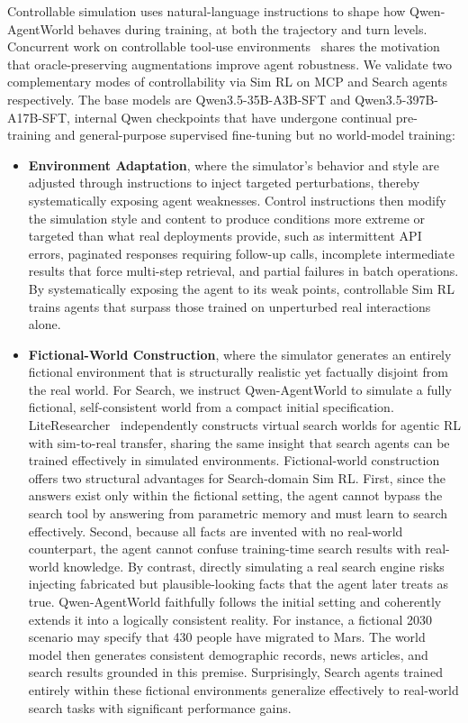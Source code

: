 \documentclass{llmxive}
\providecommand{\method}{Qwen-AgentWorld\xspace}
\begin{document}
Controllable simulation uses natural-language instructions to shape how \method behaves during training, at both the trajectory and turn levels.
Concurrent work on controllable tool-use environments~\citep{xu2026controllable} shares the motivation that oracle-preserving augmentations improve agent robustness.
We validate two complementary modes of controllability via Sim RL on MCP and Search agents respectively.
The base models are Qwen3.5-35B-A3B-SFT and Qwen3.5-397B-A17B-SFT, internal Qwen checkpoints that have undergone continual pre-training and general-purpose supervised fine-tuning but no world-model training:
\begin{itemize}[leftmargin=1.5em,itemsep=2pt]
    \item \textbf{Environment Adaptation}, where the simulator’s behavior and style are adjusted through instructions to inject targeted perturbations, thereby systematically exposing agent weaknesses.
    Control instructions then modify the simulation style and content to produce conditions more extreme or targeted than what real deployments provide, such as intermittent API errors, paginated responses requiring follow-up calls, incomplete intermediate results that force multi-step retrieval, and partial failures in batch operations.
    By systematically exposing the agent to its weak points, controllable Sim RL trains agents that surpass those trained on unperturbed real interactions alone.

    \item \textbf{Fictional-World Construction}, where the simulator generates an entirely fictional environment that is structurally realistic yet factually disjoint from the real world.
    For Search, we instruct \method to simulate a fully fictional, self-consistent world from a compact initial specification.
    LiteResearcher~\citep{li2026literesearcher} independently constructs virtual search worlds for agentic RL with sim-to-real transfer, sharing the same insight that search agents can be trained effectively in simulated environments.
    Fictional-world construction offers two structural advantages for Search-domain Sim RL.
    First, since the answers exist only within the fictional setting, the agent cannot bypass the search tool by answering from parametric memory and must learn to search effectively.
    Second, because all facts are invented with no real-world counterpart, the agent cannot confuse training-time search results with real-world knowledge. By contrast, directly simulating a real search engine risks injecting fabricated but plausible-looking facts that the agent later treats as true.
    \method faithfully follows the initial setting and coherently extends it into a logically consistent reality.
    For instance, a fictional 2030 scenario may specify that 430 people have migrated to Mars.
    The world model then generates consistent demographic records, news articles, and search results grounded in this premise.
    Surprisingly, Search agents trained entirely within these fictional environments generalize effectively to real-world search tasks with significant performance gains.
\end{itemize}
\end{document}
